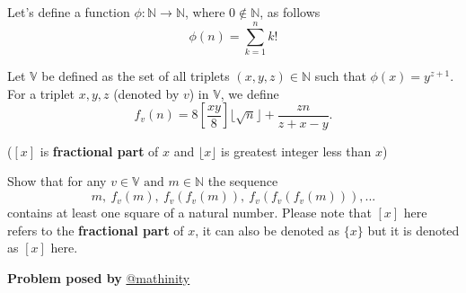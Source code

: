 \documentclass[12pt]{article}
\begin{document}
\begin{flushleft}
\subsection*{}
Let's define a function $\phi:\mathbb{N}\rightarrow \mathbb{N}$, where $0\notin\mathbb{N}$, as follows
\[\phi(n)=\sum_{k=1}^{n}k!\]
 
 Let $\mathbb{V}$ be defined as the set of all triplets $(x,y,z) \in \mathbb{N}$ such that $\phi(x) = y^{z+1}$. For a triplet $x,y,z$ (denoted by $v$) in $\mathbb{V}$, we define
 \[f_{v}(n)=8\left[\frac{xy}{8}\right]\lfloor \sqrt{n}\rfloor+\frac{zn}{z+x-y}.\]
 \begin{flushright}
 ($[x]$ is \textbf{fractional part}  of $x$ and $\lfloor x \rfloor$ is greatest integer less than $x$)
 \end{flushright}
 
 Show that for any $v\in\mathbb{V}\text{ and }m\in\mathbb{N}$ the sequence 
 \[m,\ f_{v}(m),\ f_{v}(f_{v}(m)),\ f_{v}(f_{v}(f_{v}(m))),...\]
 contains at least one square of a natural number. Please note that $[x]$ here refers to the \textbf{fractional part} of $x$, it can also be denoted as $\{x\}$ but it is denoted as $[x]$ here.
 
 
 
 \begin{flushright}
\textbf{Problem posed by}
\textcolor{RoyalBlue2}{\href{https://www.instagram.com/mathinity/}{@mathinity}}
\end{flushright}
 
 
 
 
 
 

\end{flushleft}
\end{document}
